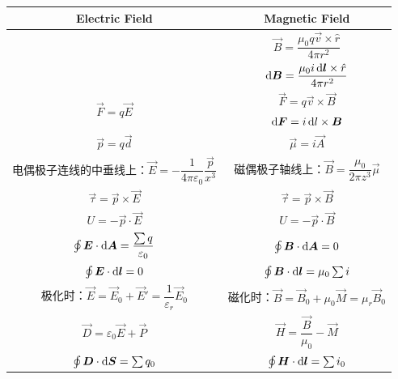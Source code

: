 \begin{longtable}[c]{cc}
    \hline
    Electric Field      & Magnetic Field \\ \hline
    \endhead
    \hline
    \endfoot
    \endlastfoot
    \multirow{2}{*}{$\vec{E} = \dfrac{1}{4\pi\varepsilon_0 r^2}\hat{r}$} & $\vec{B}=\dfrac{\mu_0 q \vec{v}\times\hat{r}}{4\pi r^2}$ \\[1.5em]
                                                                        & $\dif{\vec{B}}=\dfrac{\mu_0 i\dif{\vec{l}}\times\hat{r}}{4\pi r^2}$ \\[1.5em]
    
                                                                        \multirow{2}{*}{$\vec{F}=q\vec{E}$} & $\vec{F}=q\vec{v}\times\vec{B}$ \\
                                        & $\dif{\vec{F}}=i\dif{l}\times\vec{B}$ \\
    
                                        $\vec{p}=q\vec{d}$ & $\vec{\mu} = i\vec{A}$ \\
    
    电偶极子连线的中垂线上：$\vec{E} = -\dfrac{1}{4\pi\varepsilon_0}\dfrac{\vec{p}}{x^3}$ & 磁偶极子轴线上：$\vec{B}=\dfrac{\mu_0}{2\pi z^3}\vec{\mu}$ \\
    
    $\vec{\tau}=\vec{p}\times\vec{E}$ & $\vec{\tau}=\vec{p}\times\vec{B}$ \\
    
    $U = -\vec{p}\cdot\vec{E}$ & $U = -\vec{p}\cdot\vec{B}$ \\
    
    $\oint\vec{E}\cdot\dif{\vec{A}}=\dfrac{\sum q}{\varepsilon_0}$ & $\oint\vec{B}\cdot\dif{\vec{A}}=0$ \\
    
    $\oint\vec{E}\cdot\dif{\vec{l}}=0$ & $\oint\vec{B}\cdot\dif{\vec{l}}=\mu_0\sum i$ \\
    
    极化时：$\vec{E}=\vec{E}_0+\vec{E}'= \dfrac{1}{\varepsilon_r}\vec{E}_0$ & 磁化时：$\vec{B}=\vec{B}_0+\mu_0 \vec{M}= \mu_r\vec{B}_0$ \\
    
    $\vec{D}=\varepsilon_0\vec{E}+\vec{P}$ & $\vec{H}=\dfrac{\vec{B}}{\mu_0}-\vec{M}$ \\
    
    $\oint\vec{D}\cdot\dif{\vec{S}}=\sum q_0$ & $\oint \vec{H}\cdot\dif{\vec{l}}=\sum i_0$ \\
    

\end{longtable}
